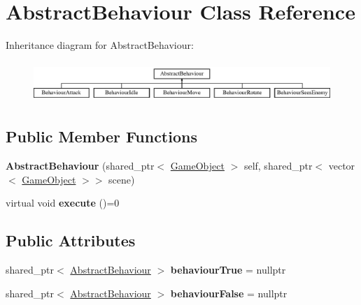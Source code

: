 \hypertarget{class_abstract_behaviour}{}\section{Abstract\+Behaviour Class Reference}
\label{class_abstract_behaviour}
Inheritance diagram for Abstract\+Behaviour\+:\begin{figure}[H]
\begin{center}
\leavevmode
\includegraphics[height=1.555556cm]{class_abstract_behaviour}
\end{center}
\end{figure}
\subsection*{Public Member Functions}
\begin{DoxyCompactItemize}
\item 
\mbox{\label{class_abstract_behaviour_a8a3a9217b3179f949a1d6a32f340c00c}} 
{\bfseries Abstract\+Behaviour} (shared\+\_\+ptr$<$ \mbox{\hyperlink{class_game_object}{Game\+Object}} $>$ self, shared\+\_\+ptr$<$ vector$<$ \mbox{\hyperlink{class_game_object}{Game\+Object}} $>$$>$ scene)
\item 
\mbox{\label{class_abstract_behaviour_ab99fb55a3b001e759e24d5b9721a742f}} 
virtual void {\bfseries execute} ()=0
\end{DoxyCompactItemize}
\subsection*{Public Attributes}
\begin{DoxyCompactItemize}
\item 
\mbox{\label{class_abstract_behaviour_a31b24fd948394c975ef56593e4ac0b28}} 
shared\+\_\+ptr$<$ \mbox{\hyperlink{class_abstract_behaviour}{Abstract\+Behaviour}} $>$ {\bfseries behaviour\+True} = nullptr
\item 
\mbox{\label{class_abstract_behaviour_ad8e09f7cb5f6341b16f20845c8d3dd59}} 
shared\+\_\+ptr$<$ \mbox{\hyperlink{class_abstract_behaviour}{Abstract\+Behaviour}} $>$ {\bfseries behaviour\+False} = nullptr
\end{DoxyCompactItemize}
